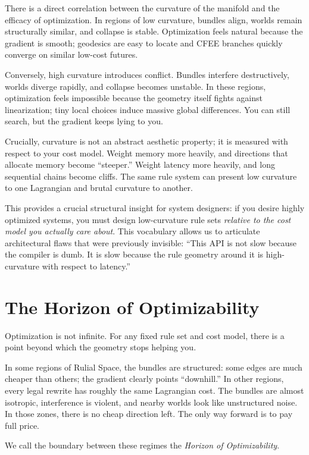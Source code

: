 There is a direct correlation between the curvature of the manifold and the efficacy of optimization. In regions of low curvature, bundles align, worlds remain structurally similar, and collapse is stable. Optimization feels natural because the gradient is smooth; geodesics are easy to locate and CFEE branches quickly converge on similar low-cost futures.

Conversely, high curvature introduces conflict. Bundles interfere destructively, worlds diverge rapidly, and collapse becomes unstable. In these regions, optimization feels impossible because the geometry itself fights against linearization; tiny local choices induce massive global differences. You can still search, but the gradient keeps lying to you.

Crucially, curvature is not an abstract aesthetic property; it is measured with respect to your cost model. Weight memory more heavily, and directions that allocate memory become ``steeper.'' Weight latency more heavily, and long sequential chains become cliffs. The same rule system can present low curvature to one Lagrangian and brutal curvature to another.

This provides a crucial structural insight for system designers: if you desire highly optimized systems, you must design low-curvature rule sets \emph{relative to the cost model you actually care about}. This vocabulary allows us to articulate architectural flaws that were previously invisible: ``This API is not slow because the compiler is dumb. It is slow because the rule geometry around it is high-curvature with respect to latency.''

\section{The Horizon of Optimizability}
\label{horizon-of-optimizability}

Optimization is not infinite. For any fixed rule set and cost model, there is a point beyond which the geometry stops helping you.

In some regions of Rulial Space, the bundles are structured: some edges are much cheaper than others; the gradient clearly points ``downhill.'' In other regions, every legal rewrite has roughly the same Lagrangian cost. The bundles are almost isotropic, interference is violent, and nearby worlds look like unstructured noise. In those zones, there is no cheap direction left. The only way forward is to pay full price.

We call the boundary between these regimes the \emph{Horizon of Optimizability}.


